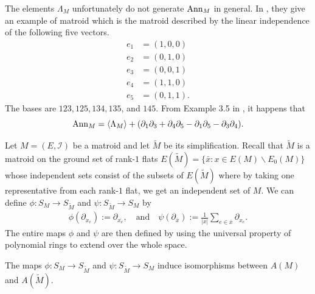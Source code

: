 \documentclass{puthesis-UG}
\begin{document}
\begin{example}
	The elements $\Lambda_M$ unfortunately do not generate $\operatorname{Ann}_M$ in general. In \cite{MN-gorenstein}, they give an example of matroid which is the matroid described by the linear independence of the following five vectors. 
	\begin{align*}
	 	e_1 & = (1, 0, 0) \\
	 	e_2 & = (0, 1, 0) \\
	 	e_3 & = (0, 0, 1) \\
	 	e_4 & = (1, 1, 0) \\
	 	e_5 & = (0, 1, 1).
	\end{align*}
	The bases are $123, 125, 134, 135$, and $145$. From Example 3.5 in \cite{MN-gorenstein}, it happens that 
	\[
		\operatorname{Ann}_M = \langle \Lambda_M \rangle + (\partial_1 \partial_3 + \partial_{4} \partial_5 - \partial_1 \partial_5 - \partial_3 \partial_4).
	\]
\end{example}


Let $M = (E, \mathcal{I})$ be a matroid and let $\widetilde{M}$ be its simplification. Recall that $\widetilde{M}$ is a matroid on the ground set of rank-$1$ flats $E(\widetilde{M}) = \{\bar{x} : x \in E(M) \backslash E_0 (M)\}$ whose independent sets consist of the subsets of $E(\widetilde{M})$ where by taking one representative from each rank-$1$ flat, we get an independent set of $M$. We can define $\phi : S_M \to S_{\widetilde{M}}$ and $\psi : S_{\widetilde{M}} \to S_M$ by 
\begin{align*}
	\phi (\partial_{x_e}) := \partial_{\overline{x_e}}, \quad \text{and} \quad \psi (\partial_{\overline{x}}) := \frac{1}{|\overline{x}|} \sum_{e \in \overline{x}} \partial_{x_e}.
\end{align*}
The entire maps $\phi$ and $\psi$ are then defined by using the universal property of polynomial rings to extend over the whole space. 

\begin{thm} \label{only-simplification-matters}
	The maps $\phi : S_M \to S_{\widetilde{M}}$ and $\psi : S_{\widetilde{M}} \to S_M$ induce isomorphisms between $A(M)$ and $A(\widetilde{M})$. 
\end{thm}
\end{document}

